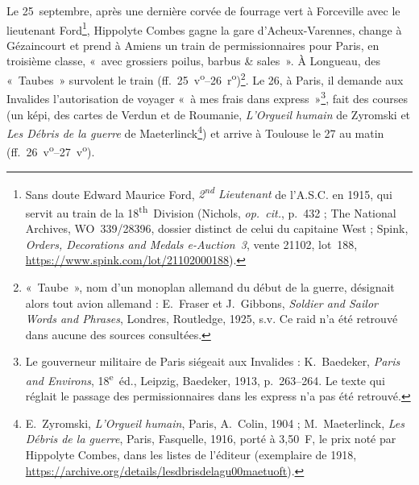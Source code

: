 Le 25~septembre, après une dernière corvée de fourrage vert à Forceville avec le lieutenant Ford\footnote{Sans doute Edward Maurice Ford, \textit{2\textsuperscript{nd} Lieutenant} de l'A.S.C. en 1915, qui servit au train de la 18\textsuperscript{th}~Division (Nichols, \textit{op.~cit.}, p.~432 ; The National Archives, WO~339/28396, dossier distinct de celui du capitaine West ; Spink, \textit{Orders, Decorations and Medals e-Auction~3}, vente 21102, lot~188, \url{https://www.spink.com/lot/21102000188}).}, Hippolyte Combes gagne la gare d'Acheux-Varennes, change à Gézaincourt et prend à Amiens un train de permissionnaires pour Paris, en troisième classe, «~avec grossiers poilus, barbus \& sales~». À Longueau, des «~Taubes~» survolent le train (ff.~25~v\textsuperscript{o}--26~r\textsuperscript{o})\footnote{«~Taube~», nom d'un monoplan allemand du début de la guerre, désignait alors tout avion allemand : E.~Fraser et J.~Gibbons, \textit{Soldier and Sailor Words and Phrases}, Londres, Routledge, 1925, s.v. Ce raid n'a été retrouvé dans aucune des sources consultées.}. Le 26, à Paris, il demande aux Invalides l'autorisation de voyager «~à mes frais dans express~»\footnote{Le gouverneur militaire de Paris siégeait aux Invalides : K.~Baedeker, \textit{Paris and Environs}, 18\textsuperscript{e}~éd., Leipzig, Baedeker, 1913, p.~263--264. Le texte qui réglait le passage des permissionnaires dans les express n'a pas été retrouvé.}, fait des courses (un képi, des cartes de Verdun et de Roumanie, \textit{L'Orgueil humain} de Zyromski et \textit{Les Débris de la guerre} de Maeterlinck\footnote{E.~Zyromski, \textit{L'Orgueil humain}, Paris, A.~Colin, 1904 ; M.~Maeterlinck, \textit{Les Débris de la guerre}, Paris, Fasquelle, 1916, porté à 3,50~F, le prix noté par Hippolyte Combes, dans les listes de l'éditeur (exemplaire de 1918, \url{https://archive.org/details/lesdbrisdelagu00maetuoft}).}) et arrive à Toulouse le 27 au matin (ff.~26~v\textsuperscript{o}--27~v\textsuperscript{o}).

